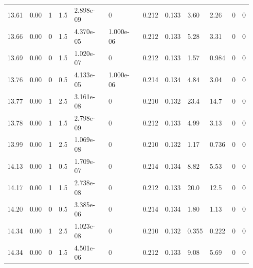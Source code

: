 \documentclass[preview]{standalone}
\begin{document}
{{{{{\begin{tabular}{L{1.2cm}C{1.2cm} C{0.3cm}C{0.5cm} C{1.4cm}C{1.4cm} C{1.4cm}C{1.4cm} C{1.6cm}C{1.6cm} C{1.6cm}C{1.6cm}}
  13.61  &  0.00  & 1     & 1.5 &  2.898e-09  & 0  &  0.212&   0.133& 3.60 & 2.26   &  0 & 0  \\ 
  13.66  &  0.00  & 0     & 1.5 &  4.370e-05  & 1.000e-06  &  0.212&   0.133& 5.28 & 3.31   &  0 & 0  \\ 
  13.69  &  0.00  & 0     & 1.5 &  1.020e-07  & 0  &  0.212&   0.133& 1.57 & 0.984   &  0 & 0  \\ 
  13.76  &  0.00  & 0     & 0.5 &  4.133e-05  & 1.000e-06  &  0.214&   0.134& 4.84 & 3.04   &  0 & 0  \\ 
  13.77  &  0.00  & 1     & 2.5 &  3.161e-08  & 0  &  0.210&   0.132& 23.4 & 14.7   &  0 & 0  \\ 
  13.78  &  0.00  & 1     & 1.5 &  2.798e-09  & 0  &  0.212&   0.133& 4.99 & 3.13   &  0 & 0  \\ 
  13.99  &  0.00  & 1     & 2.5 &  1.069e-08  & 0  &  0.210&   0.132& 1.17 & 0.736   &  0 & 0  \\ 
  14.13  &  0.00  & 1     & 0.5 &  1.709e-07  & 0  &  0.214&   0.134& 8.82 & 5.53   &  0 & 0  \\ 
  14.17  &  0.00  & 1     & 1.5 &  2.738e-08  & 0  &  0.212&   0.133& 20.0 & 12.5   &  0 & 0  \\ 
  14.20  &  0.00  & 0     & 0.5 &  3.385e-06  & 0  &  0.214&   0.134& 1.80 & 1.13   &  0 & 0  \\ 
  14.34  &  0.00  & 1     & 2.5 &  1.023e-08  & 0  &  0.210&   0.132& 0.355 & 0.222   &  0 & 0  \\ 
  14.34  &  0.00  & 0     & 1.5 &  4.501e-06  & 0  &  0.212&   0.133& 9.08 & 5.69   &  0 & 0  \\ 
\hline 
\end{tabular} 

}}}}}
\end{document}
